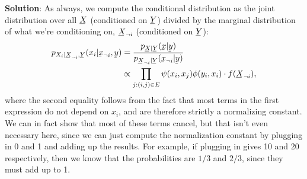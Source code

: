 \documentclass[12pt]{article}
\newcommand{\bunderline}[2][4]{\underline{#2\mkern-#1mu}\mkern#1mu}
\newcommand{\uX}{{\bunderline{X}}}
\newcommand{\ux}{{\bunderline{x}}}
\newcommand{\uY}{{\bunderline{Y}}}
\newcommand{\uy}{{\bunderline{y}}}
\begin{document}
    \noindent \textbf{Solution}: As always, we compute the conditional distribution
    as the joint distribution over all $\uX$ (conditioned on $\uY$) divided
    by the marginal distribution of what we're conditioning on, $\uX_{\neg i}$ (conditioned
    on $\uY$):
    \begin{align}
        p_{X_i | \uX_{\neg i}, \uY}(x_i | \ux_{\neg i}, \uy)
        &= \frac{p_{\uX| \uY}(\ux| \uy)}{p_{\uX_{\neg i}| \uY}(\ux_{\neg i}| \uy)} \\
        &\propto \prod_{j: (i,j) \in E} \psi(x_i, x_j) \phi(y_i, x_i) \cdot f(\uX_{\neg i}),
    \end{align}
    where the second equality follows from the fact that most terms in the
    first expression do not depend on $x_i$, and are therefore strictly a
    normalizing constant. We can in fact show that most of these terms cancel,
    but that isn't even necessary here, since we can just compute the
    normalization constant by plugging in 0 and 1 and adding up the results.
    For example, if plugging in gives 10 and 20 respectively, then we know that
    the probabilities are $1/3$ and $2/3$, since they must add up to 1.
\end{document}
